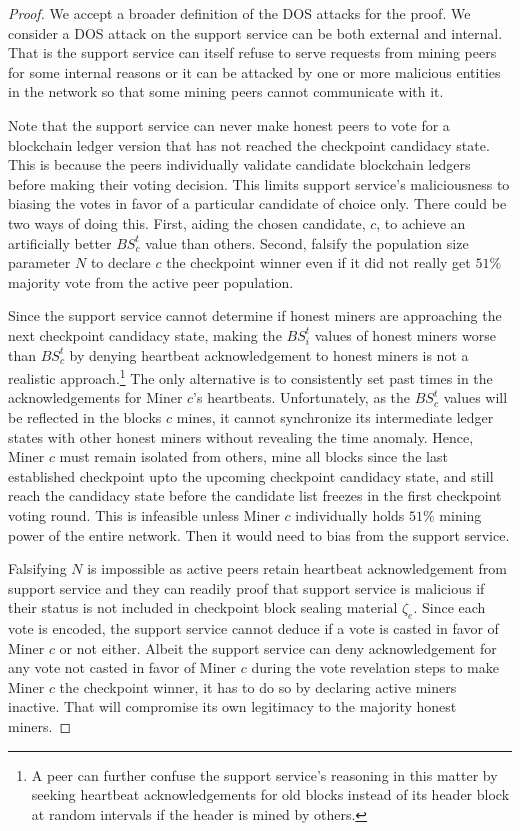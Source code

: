 \documentclass[conference]{IEEEtran}
\begin{document}
\begin{proof}
We accept a broader definition of the DOS attacks for the proof. We consider a DOS attack on the support service can be both external and internal. That is the support service can itself refuse to serve requests from mining peers for some internal reasons or it can be attacked by one or more malicious entities in the network so that some mining peers cannot communicate with it. 

Note that the support service can never make honest peers to vote for a blockchain ledger version that has not reached the checkpoint candidacy state. This is because the peers individually validate candidate blockchain ledgers before making their voting decision. This limits support service's maliciousness to biasing the votes in favor of a particular candidate of choice only. There could be two ways of doing this. First, aiding the chosen candidate, $c$, to achieve an artificially better $BS_c^t$ value than others. Second, falsify the population size parameter $N$ to declare $c$ the checkpoint winner even if it did not really get $51\%$ majority vote from the active peer population.  

Since the support service cannot determine if honest miners are approaching the next checkpoint candidacy state, making the $BS_i^t$ values of honest miners worse than $BS_c^t$ by denying heartbeat acknowledgement to honest miners is not a realistic approach.\footnote{A peer can further confuse the support service's reasoning in this matter by seeking heartbeat acknowledgements for old blocks instead of its header block at random intervals if the header is mined by others.} The only alternative is to consistently set past times in the acknowledgements for Miner $c$'s heartbeats. Unfortunately, as the $BS_c^t$ values will be reflected in the blocks $c$ mines, it cannot synchronize its intermediate ledger states with other honest miners without revealing the time anomaly. Hence, Miner $c$ must remain isolated from others, mine all blocks since the last established checkpoint upto the upcoming checkpoint candidacy state, and still reach the candidacy state before the candidate list freezes in the first checkpoint voting round. This is infeasible unless Miner $c$ individually holds $51\%$ mining power of the entire network. Then it would need to bias from the support service.      

Falsifying $N$ is impossible as active peers retain heartbeat acknowledgement from support service and they can readily proof that support service is malicious if their status is not included in checkpoint block sealing material $\zeta_e$. Since each vote is encoded, the support service cannot deduce if a vote is casted in favor of Miner $c$ or not either. Albeit the support service can deny acknowledgement for any vote not casted in favor of Miner $c$ during the vote revelation steps to make Miner $c$ the checkpoint winner, it has to do so by declaring active miners inactive. That will compromise its own legitimacy to the majority honest miners.


\end{proof}
\end{document}
